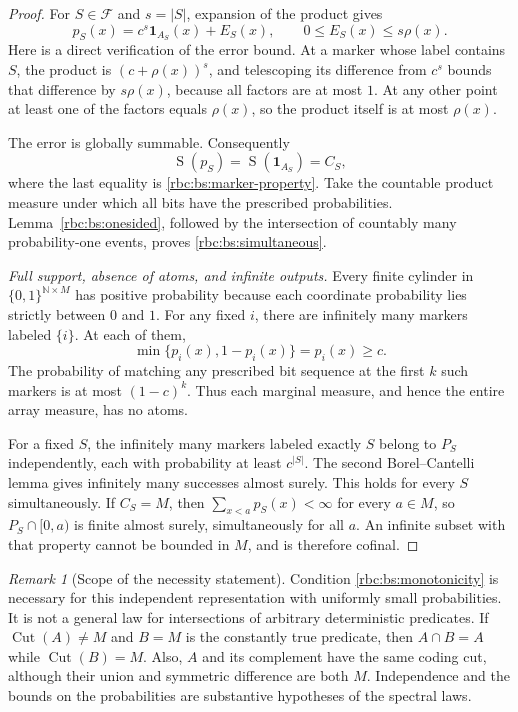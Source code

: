 \documentclass[11pt]{article}
\numberwithin{equation}{section}
\theoremstyle{definition}
\theoremstyle{remark}
\newtheorem{remark}[theorem]{Remark}
\newcommand{\N}{\mathbb N}
\newcommand{\Cut}{\operatorname{Cut}}
\newcommand{\SumCut}{\operatorname{S}}
\begin{document}
\begin{proof}
For $S\in\mathcal F$ and $s=|S|$, expansion of the product gives
\begin{equation}
\label{rbc:bs:product-error}
  p_S(x)=c^s\mathbf1_{A_S}(x)+E_S(x),
  \qquad 0\leq E_S(x)\leq s\rho(x).
\end{equation}
Here is a direct verification of the error bound.  At a marker whose label
contains $S$, the product is $(c+\rho(x))^s$, and telescoping its difference
from $c^s$ bounds that difference by $s\rho(x)$, because all factors are
at most $1$.  At any other point at least one of the factors equals
$\rho(x)$, so the product itself is at most $\rho(x)$.

The error is globally summable.  Consequently
\[
  \SumCut(p_S)
    =\SumCut(\mathbf1_{A_S})
    =C_S,
\]
where the last equality is \eqref{rbc:bs:marker-property}.  Take the countable
product measure under which all bits have the prescribed probabilities.
Lemma~\ref{rbc:bs:onesided}, followed by the intersection of countably many
probability-one events, proves \eqref{rbc:bs:simultaneous}.

\emph{Full support, absence of atoms, and infinite outputs.}
Every finite cylinder in $\{0,1\}^{\N\times M}$ has positive probability
because each coordinate probability lies strictly between $0$ and $1$.
For any fixed $i$, there are infinitely many markers labeled $\{i\}$.
At each of them,
\[
  \min\{p_i(x),1-p_i(x)\}=p_i(x)\geq c.
\]
The probability of matching any prescribed bit sequence at the first $k$
such markers is at most $(1-c)^k$.  Thus each marginal measure, and hence
the entire array measure, has no atoms.

For a fixed $S$, the infinitely many markers labeled exactly $S$ belong
to $P_S$ independently, each with probability at least $c^{|S|}$.
The second Borel--Cantelli lemma gives infinitely many successes almost
surely.  This holds for every $S$ simultaneously.  If $C_S=M$, then
$\sum_{x<a}p_S(x)<\infty$ for every $a\in M$, so $P_S\cap[0,a)$ is
finite almost surely, simultaneously for all $a$.  An infinite subset
with that property cannot be bounded in $M$, and is therefore cofinal.
\end{proof}

\begin{remark}[Scope of the necessity statement]
\label{rbc:bs:scope}
Condition \eqref{rbc:bs:monotonicity} is necessary for this independent
representation with uniformly small probabilities.  It is not a general
law for intersections of arbitrary deterministic predicates.  If
$\Cut(A)\ne M$ and $B=M$ is the constantly true predicate, then
$A\cap B=A$ while $\Cut(B)=M$.  Also, $A$ and its complement have the
same coding cut, although their union and symmetric difference are both
$M$.  Independence and the bounds on the probabilities are substantive
hypotheses of the spectral laws.
\end{remark}
\end{document}
